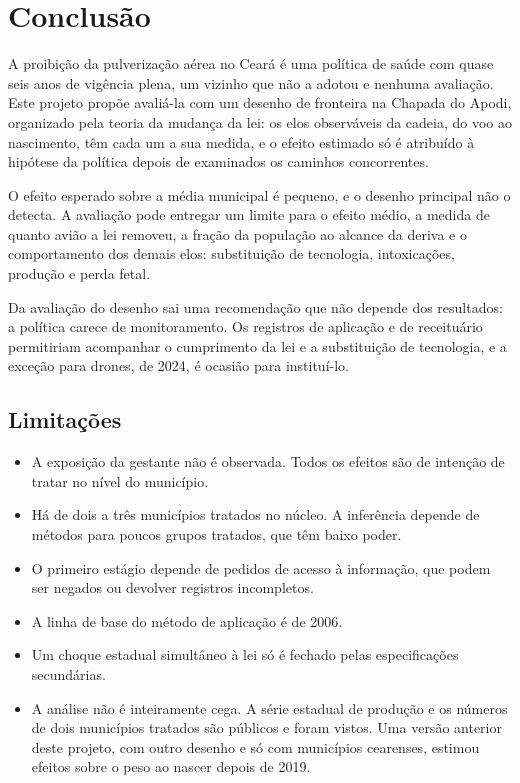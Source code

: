\section{Conclusão}
\label{sec:conclusao}

A proibição da pulverização aérea no Ceará é uma política de saúde com quase
seis anos de vigência plena, um vizinho que não a adotou e nenhuma avaliação. Este
projeto propõe avaliá-la com um desenho de fronteira na Chapada do Apodi,
organizado pela teoria da mudança da lei: os elos observáveis da cadeia, do voo
ao nascimento, têm cada um a sua medida, e o efeito estimado só é atribuído à
hipótese da política depois de examinados os caminhos concorrentes.

O efeito esperado sobre a média municipal é pequeno, e o desenho principal não
o detecta. A avaliação pode entregar um limite para o efeito médio, a medida de
quanto avião a lei removeu, a fração da população ao alcance da deriva e o
comportamento dos demais elos: substituição de tecnologia, intoxicações,
produção e perda fetal.

Da avaliação do desenho sai uma recomendação que não depende dos resultados: a
política carece de monitoramento. Os registros de aplicação e de receituário
permitiriam acompanhar o cumprimento da lei e a substituição de tecnologia, e a
exceção para drones, de 2024, é ocasião para instituí-lo.

\subsection{Limitações}

\begin{itemize}
\item A exposição da gestante não é observada. Todos os efeitos são de
intenção de tratar no nível do município.
\item Há de dois a três municípios tratados no núcleo. A inferência depende de
métodos para poucos grupos tratados, que têm baixo poder.
\item O primeiro estágio depende de pedidos de acesso à informação, que podem
ser negados ou devolver registros incompletos.
\item A linha de base do método de aplicação é de 2006.
\item Um choque estadual simultâneo à lei só é fechado pelas especificações
secundárias.
\item A análise não é inteiramente cega. A série estadual de produção e os
números de dois municípios tratados são públicos e foram vistos. Uma versão
anterior deste projeto, com outro desenho e só com municípios cearenses,
estimou efeitos sobre o peso ao nascer depois de 2019.
\end{itemize}

